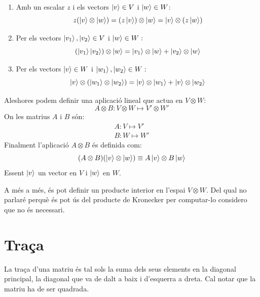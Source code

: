 \begin{enumerate}
	\item Amb un escalar $z$ i els vectors $\ket{v} \in V$ i $\ket{w} \in W$:
\begin{equation*}
	z(\ket{v} \otimes \ket{w}) = (z\ket{v}) \otimes \ket{w} = \ket{v} \otimes (z\ket{w})
\end{equation*}

	\item Per els vectors $\ket{v_{1}}, \ket{v_{2}} \in V$ i $\ket{w} \in W:$
\begin{equation*}
	(\ket{v_{1}} \ket{v_{2}}) \otimes\ket{w} = \ket{v_{1}}\otimes\ket{w} + \ket{v_{2}}\otimes\ket{w}
\end{equation*}

	\item Per els vectors $\ket{v}\in W$ i $\ket{w_{1}}, \ket{w_{2}} \in W:$
\begin{equation*}
	\ket{v}\otimes(\ket{w_{1}}\otimes\ket{w_{2}}) = \ket{v}\otimes\ket{w_{1}} + \ket{v}\otimes\ket{w_{2}}
\end{equation*}
\end{enumerate}

Aleshores podem definir una aplicació lineal que actua en $V\otimes W$:
\begin{equation*}
	A\otimes B : V \otimes W \mapsto V' \otimes W'
\end{equation*}
On les matrius $A$ i $B$ són:
\begin{align*}
	A:V\mapsto V' \\
	B:W\mapsto W' 
\end{align*}
Finalment l'aplicació $A\otimes B$ és definida com:
\begin{equation*}
	(A\otimes B)(\ket{v}\otimes\ket{w}) \equiv A\ket{v} \otimes B\ket{w}
\end{equation*}
Essent $\ket{v}$ un vector en $V$ i $\ket{w}$ en $W$.

A més a més, és pot definir un producte interior en l'espai $V\otimes W$. Del qual no parlaré perquè és pot ús del producte de Kronecker per computar-lo considero que no és necessari. 



\section{Traça}
La traça d'una matriu és tal sols la suma dels seus elements en la diagonal principal, la diagonal que va de dalt a baix i d'esquerra a dreta. Cal notar que la matriu ha de ser quadrada. 

